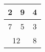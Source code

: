 \documentclass{article}
\begin{document}
\begin{tabular}{|c|c|c|}
\hline 2&9&4\\
\hline 7&5&3\\
\hline \multicolumn{2}{|c|}{12}&8\\
\hline
\end{tabular}
\end{document}
